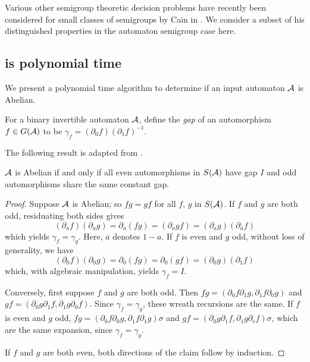 \documentclass[11pt, titlepage]{article}
\begin{document}
Various other semigroup theoretic decision problems have recently been
considered for small classes of semigroups by Cain in
\cite{Cain09:dec_prob}. We consider a subset of his distinguished
properties in the automaton semigroup case here.


\subsection{ is polynomial time}

We present a polynomial time algorithm to determine if an input
automaton $\mathcal{A}$ is Abelian.

For a binary invertible automaton $\mathcal{A}$, define the \emph{gap} of an
automorphism $f \in G(\mathcal{A})$ to be
$\gamma_f = (\partial_0 f)(\partial_1 f)^{-1}$.

The following result is adapted from \cite{okano:thesis}.

\begin{lemma}
  $\mathcal{A}$ is Abelian if and only if all even automorphisms in $S(\mathcal{A})$
  have gap $I$ and odd automorphisms share the same constant gap.
\end{lemma}

\begin{proof}
Suppose $\mathcal{A}$ is Abelian; so $fg = gf$ for all $f$, $g$ in $S(\mathcal{A})$.
If $f$ and $g$ are both odd, residuating both sides gives
\[
  (\partial_a f)(\partial_{\overline{a}}g) =
  \partial_a (fg) =
  (\partial_a gf) =
  (\partial_a g)(\partial_{\overline{a}}f)
\]
which yields $\gamma_f = \gamma_g$. Here, $\overline{a}$ denotes $1 - a$.
If $f$ is even and $g$ odd, without loss of generality, we have
\[
  (\partial_0f)(\partial_0 g) = 
  \partial_0(fg) =
  \partial_0(gf) =
  (\partial_0g)(\partial_1 f)
\]
which, with algebraic manipulation, yields $\gamma_f = I$.

Conversely, first suppose $f$ and $g$ are both odd. Then
$fg = (\partial_0 f \partial_1 g, \partial_1 f \partial_0 g)$ and
$gf = (\partial_0 g \partial_1 f, \partial_1 g \partial_0 f)$. Since
$\gamma_f = \gamma_g$, these wreath recursions are the same. If $f$ is
even and $g$ odd,
$fg = (\partial_0f \partial_0g, \partial_1 f \partial_1 g)\sigma$ and
$gf = (\partial_0g \partial_1f, \partial_1 g \partial_r f)\sigma$,
which are the same expansion, since $\gamma_f = \gamma_g$.

If $f$ and $g$ are both even, both directions of the claim follow by
induction.
\end{proof}
\end{document}
